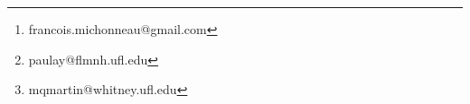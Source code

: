 \usepackage{authblk}
\author[1]{Fran\c{c}ois Michonneau\thanks{francois.michonneau@gmail.com}}
\author[2]{Gustav Paulay\thanks{paulay@flmnh.ufl.edu}}
\author[1]{Mark Q. Martindale\thanks{mqmartin@whitney.ufl.edu}}


\renewcommand\Authands{ and }
\date{}


